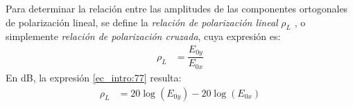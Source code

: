 Para determinar la relación entre las amplitudes de las componentes ortogonales de polarización lineal, se define la \emph{relación de polarización lineal} $\rho_L$ \cite{Fano2}, o simplemente \emph{relación de polarización cruzada}, cuya expresión es:
\begin{align}
\rho_L &= \dfrac{E_{0y}}{E_{0x}}
\label{ec_intro:77}
\end{align}
En dB, la expresión \eqref{ec_intro:77} resulta:
\begin{align}
\rho_L &= 20\log\left(E_{0y}\right) -  20\log\left(E_{0x}\right)
\label{ec_intro:78}
\end{align}
